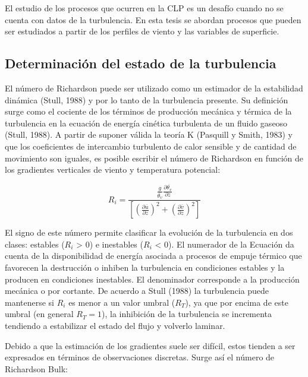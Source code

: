 \documentclass[12pt,spanish,oneside]{book}
\begin{document}
El estudio de los procesos que ocurren en la CLP es un desafío cuando no
se cuenta con datos de la turbulencia. En esta tesis se abordan procesos
que pueden ser estudiados a partir de los perfiles de viento y las
variables de superficie.

\subsection{Determinación del estado de la
turbulencia}\label{determinacion-del-estado-de-la-turbulencia}

El número de Richardson puede ser utilizado como un estimador de la
estabilidad dinámica (Stull, 1988) y por lo tanto de la turbulencia
presente. Su definición surge como el cociente de los términos de
producción mecánica y térmica de la turbulencia en la ecuación de
energía cinética turbulenta de un fluido gaseoso (Stull, 1988). A partir
de suponer válida la teoría K (Pasquill y Smith, 1983) y que los
coeficientes de intercambio turbulento de calor sensible y de cantidad
de movimiento son iguales, es posible escribir el número de Richardson
en función de los gradientes verticales de viento y temperatura
potencial:

\begin{equation} \label{eq-ri1}
R_i = \frac{\frac{g}{\overline{\theta_v}} \frac{\partial \overline{\theta_v}}{\partial z}}
{\left [ \left (\frac{\partial \overline{u}}{\partial z} \right )^2 + \left (\frac{\partial \overline{v}}{\partial z} \right )^2  \right]}
\end{equation}

El signo de este número permite clasificar la evolución de la
turbulencia en dos clases: estables (\(R_i\) \textgreater{} 0) e
inestables (\(R_i\) \textless{} 0). El numerador de la Ecuación da
cuenta de la disponibilidad de energía asociada a procesos de empuje
térmico que favorecen la destrucción o inhiben la turbulencia en
condiciones estables y la producen en condiciones inestables. El
denominador corresponde a la producción mecánica o por cortante. De
acuerdo a Stull (1988) la turbulencia puede mantenerse si \(R_i\) es
menor a un valor umbral (\(R_T\)), ya que por encima de este umbral (en
general \(R_T = 1\)), la inhibición de la turbulencia se incrementa
tendiendo a estabilizar el estado del flujo y volverlo laminar.

Debido a que la estimación de los gradientes suele ser difícil, estos
tienden a ser expresados en términos de observaciones discretas. Surge
así el número de Richardson Bulk:
\end{document}
